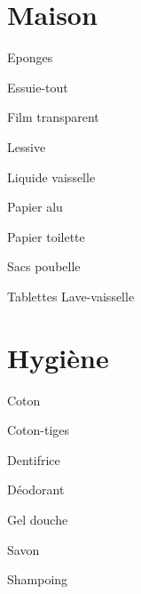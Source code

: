 \documentclass[8pt,landscape,a4paper]{article}
\begin{document}
\begin{multicols*}{4}
    \section{Maison}
    \begin{todolist}
    \item Eponges 
    \item Essuie-tout
    \item Film transparent
    \item Lessive
    \item Liquide vaisselle
    \item Papier alu
    \item Papier toilette
    \item Sacs poubelle
    \item Tablettes Lave-vaisselle
    \item 
    \item 
    \item 
    \item 
    \item 
    \item 
    \item 
    \item 
    \end{todolist}

    \section{Hygiène}
    \begin{todolist}
    \item Coton 
    \item Coton-tiges 
    \item Dentifrice
    \item Déodorant
    \item Gel douche
    \item Savon
    \item Shampoing
    \item 
    \item 
    \item 
    \item 
    \item 
    \item 
    \item 
    \item 
    \item 
    \item 
    \end{todolist}



    \end{multicols*}
\newpage
\end{document}
